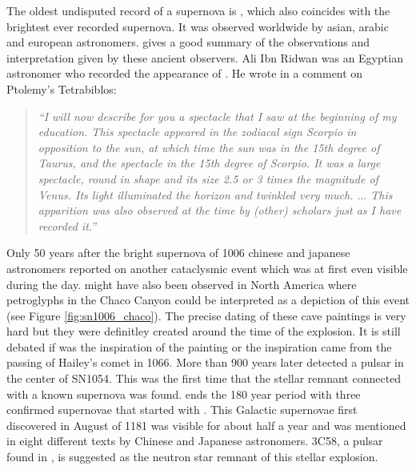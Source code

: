 The oldest undisputed record of a supernova is , which also coincides with the brightest ever recorded supernova.  It was observed worldwide by asian, arabic and european astronomers. \citet{1965AJ.....70..105G} gives a good summary of the observations and interpretation given by these ancient observers. Ali Ibn Ridwan was an Egyptian astronomer who recorded the appearance of . He wrote in a comment on Ptolemy's Tetrabiblos: 
\begin{quote}
\textit{``I will now describe for you a spectacle that I saw at the beginning of my education. This spectacle appeared in the zodiacal sign Scorpio in opposition to the sun, at which time the sun was in the 15th degree of Taurus, and the spectacle in the 15th degree of Scorpio. It was a large spectacle, round in shape and its size 2.5 or 3 times the magnitude of Venus. Its light illuminated the horizon and twinkled very much. $\dots$ This apparition was also observed at the time by (other) scholars just as I have recorded it.''}
\end{quote}

Only 50 years after the bright supernova of 1006 chinese and japanese astronomers reported on another cataclysmic event which was at first even visible during the day.   might have also been observed in North America where petroglyphs in the Chaco Canyon could be interpreted as a depiction of this event (see Figure \ref{fig:sn1006_chaco}). The precise dating of these cave paintings is very hard but they were definitley created around the time of the  explosion. It is still debated if  was the inspiration of the painting or the inspiration came from the passing of Hailey's comet in 1066. More than 900 years later \cite{1968Sci...162.1481S} detected a pulsar in the center of SN1054. This was the first time that the stellar remnant connected with a known supernova was found.
 ends the 180 year period with three confirmed supernovae that started with . This Galactic supernovae  first discovered in August of 1181 was visible for about half a year and was mentioned in eight different texts by Chinese and Japanese astronomers. 3C58, a pulsar found in , is suggested as the neutron star remnant of this stellar explosion. 



